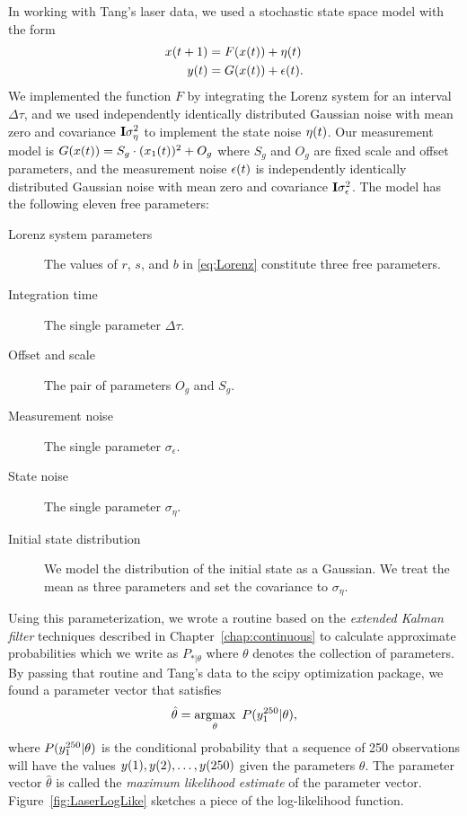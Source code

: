 In working with Tang's laser data, we used a stochastic state space
model with the form
\begin{subequations}
  \label{eq:FandG}
  \begin{align}
    {x}{(t+1)} &= F({x}{(t)}) + {\eta}{(t)}\\
    {y}{(t)}   &= G({x}{(t)}) + {\epsilon}{(t)}.
  \end{align}
\end{subequations}
We implemented the function $F$ by integrating the Lorenz system for
an interval $\Delta \tau$, and we used independently identically
distributed Gaussian noise with mean zero and covariance
${\bf I}\sigma_\eta^2$ to implement the state noise ${\eta}{(t)}$.
  Our measurement model is $G({x}{(t)}) = S_g \cdot
({x_1}{(t)})^2 + O_g$ where $S_g$ and $O_g$ are fixed scale and
offset parameters, and the measurement noise ${\epsilon}{(t)}$ is
independently identically distributed Gaussian noise with mean zero
and covariance ${\bf I}\sigma_\epsilon^2$.  The model has the following
eleven free parameters:
\begin{description}
\item[Lorenz system parameters] The values of $r$, $s$, and $b$ in
  \eqref{eq:Lorenz} constitute three free parameters.
\item[Integration time] The single parameter $\Delta \tau$.
\item[Offset and scale] The pair of parameters $O_g$ and $S_g$.
\item[Measurement noise] The single parameter $\sigma_\epsilon$.
\item[State noise] The single parameter $\sigma_\eta$.
\item[Initial state distribution] We model the distribution of the
  initial state as a Gaussian.  We treat the mean as three
  parameters and set the covariance to $\sigma_\eta$.
\end{description}

Using this parameterization, we wrote a routine based on the
\emph{extended Kalman filter} %
%
%
techniques described in Chapter~\ref{chap:continuous} to calculate
approximate probabilities which we write as $P_{*|\theta}$ where
$\theta$ denotes the collection of parameters.  By passing that
routine and Tang's data to the scipy optimization package, we found a
parameter vector that satisfies
\begin{equation}
  \label{eq:theta-hat-laser}
  \hat \theta = \operatorname*{argmax}_{\theta} ~ P(y_{1}^{250}|\theta),
\end{equation}
where $P(y_{1}^{250}|\theta)$ is the conditional probability that a
sequence of 250 observations will have the values
${y}{(1)},{y}{(2)}, \ldots,{y}{(250)}$ given the parameters
$\theta$.  The parameter vector $\hat \theta$ is called the
\emph{maximum likelihood estimate} %
%
%
of the parameter vector.  Figure~\ref{fig:LaserLogLike} sketches a
piece of the log-likelihood function.

